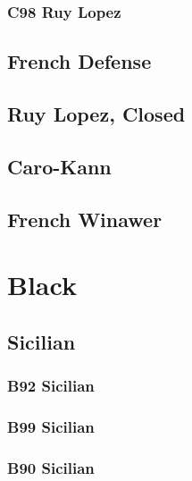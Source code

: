 \documentclass[]{book}
\begin{document}
\hypertarget{c98-ruy-lopez}{%
\subsubsection{C98 Ruy Lopez}\label{c98-ruy-lopez}}

\hypertarget{french-defense}{%
\subsection{French Defense}\label{french-defense}}

\hypertarget{ruy-lopez-closed}{%
\subsection{Ruy Lopez, Closed}\label{ruy-lopez-closed}}

\hypertarget{caro-kann}{%
\subsection{Caro-Kann}\label{caro-kann}}

\hypertarget{french-winawer}{%
\subsection{French Winawer}\label{french-winawer}}

\hypertarget{black-2}{%
\section{Black}\label{black-2}}

\hypertarget{sicilian-1}{%
\subsection{Sicilian}\label{sicilian-1}}

\hypertarget{b92-sicilian}{%
\subsubsection{B92 Sicilian}\label{b92-sicilian}}

\hypertarget{b99-sicilian}{%
\subsubsection{B99 Sicilian}\label{b99-sicilian}}

\hypertarget{b90-sicilian-1}{%
\subsubsection{B90 Sicilian}\label{b90-sicilian-1}}
\end{document}
